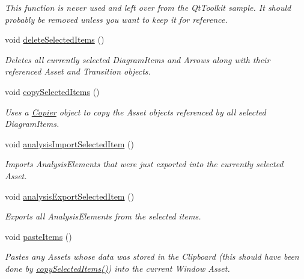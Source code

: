 \begin{DoxyCompactItemize}
\begin{DoxyCompactList}\small\item\em This function is never used and left over from the Qt\-Toolkit sample. It should probably be removed unless you want to keep it for reference. \end{DoxyCompactList}\item 
void \hyperlink{class_diagram_scene_a4a463735358fcd9fca7648348f96a32a}{delete\-Selected\-Items} ()
\begin{DoxyCompactList}\small\item\em Deletes all currently selected Diagram\-Items and Arrows along with their referenced Asset and Transition objects. \end{DoxyCompactList}\item 
void \hyperlink{class_diagram_scene_ac38f698fcd6dca66acf8df321aa82d45}{copy\-Selected\-Items} ()
\begin{DoxyCompactList}\small\item\em Uses a \hyperlink{class_copier}{Copier} object to copy the Asset objects referenced by all selected Diagram\-Items. \end{DoxyCompactList}\item 
void \hyperlink{class_diagram_scene_a9f8ac14992a88d2403e2f5eb6e80d574}{analysis\-Import\-Selected\-Item} ()
\begin{DoxyCompactList}\small\item\em Imports Analysis\-Elements that were just exported into the currently selected Asset. \end{DoxyCompactList}\item 
void \hyperlink{class_diagram_scene_a54b33b144bdd967932d0c8ee8adad55b}{analysis\-Export\-Selected\-Item} ()
\begin{DoxyCompactList}\small\item\em Exports all Analysis\-Elements from the selected items. \end{DoxyCompactList}\item 
void \hyperlink{class_diagram_scene_ade8b52a60feaa793d0903362384554d5}{paste\-Items} ()
\begin{DoxyCompactList}\small\item\em Pastes any Assets whose data was stored in the Clipboard (this should have been done by \hyperlink{class_diagram_scene_ac38f698fcd6dca66acf8df321aa82d45}{copy\-Selected\-Items()}) into the current Window Asset. \end{DoxyCompactList}\end{DoxyCompactItemize}

